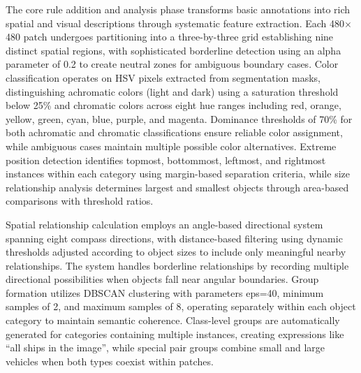 The core rule addition and analysis phase transforms basic annotations into rich spatial and visual descriptions through systematic feature extraction. Each 480$\times$480 patch undergoes partitioning into a three-by-three grid establishing nine distinct spatial regions, with sophisticated borderline detection using an alpha parameter of 0.2 to create neutral zones for ambiguous boundary cases. Color classification operates on HSV pixels extracted from segmentation masks, distinguishing achromatic colors (light and dark) using a saturation threshold below 25\% and chromatic colors across eight hue ranges including red, orange, yellow, green, cyan, blue, purple, and magenta. Dominance thresholds of 70\% for both achromatic and chromatic classifications ensure reliable color assignment, while ambiguous cases maintain multiple possible color alternatives. Extreme position detection identifies topmost, bottommost, leftmost, and rightmost instances within each category using margin-based separation criteria, while size relationship analysis determines largest and smallest objects through area-based comparisons with threshold ratios.

Spatial relationship calculation employs an angle-based directional system spanning eight compass directions, with distance-based filtering using dynamic thresholds adjusted according to object sizes to include only meaningful nearby relationships. The system handles borderline relationships by recording multiple directional possibilities when objects fall near angular boundaries. Group formation utilizes DBSCAN clustering with parameters eps=40, minimum samples of 2, and maximum samples of 8, operating separately within each object category to maintain semantic coherence. Class-level groups are automatically generated for categories containing multiple instances, creating expressions like ``all ships in the image'', while special pair groups combine small and large vehicles when both types coexist within patches.

